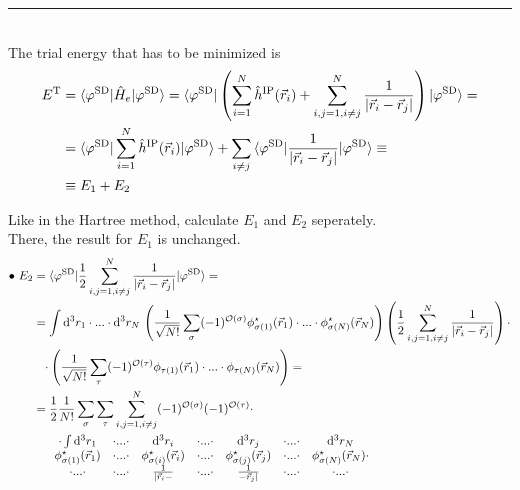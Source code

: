 \documentclass{article}
\newcommand{\diff}{\mathrm{d}}
\newcommand{\lr}[1]{\left(#1\right)}
\begin{document}
{\color{violet}
\hrule
	\\
	The trial energy that has to be minimized is
		\begin{align*}
			E^\text{T} &= \braket{ \varphi^\text{SD} | \hat{H}_e | \varphi^\text{SD} } = \braket{ \varphi^\text{SD} | \lr{ \sum_{i=1}^N \hat{h}^\text{IP}(\vec{r}_i) + \sum_{i,j=1,i\neq j}^N \frac{1}{|\vec{r}_i - \vec{r}_j|} } | \varphi^\text{SD} } = \\
			&= \braket{ \varphi^\text{SD} | \sum_{i=1}^N \hat{h}^\text{IP}(\vec{r}_i) | \varphi^\text{SD} } + \sum_{i\neq j} \braket{ \varphi^\text{SD} | \frac{1}{|\vec{r}_i - \vec{r}_j|} | \varphi^\text{SD} } \equiv\\
			&\equiv E_1 + E_2
		\end{align*}				

	Like in the Hartree method, calculate $E_1$ and $E_2$ seperately.\\
	There, the result for $E_1$ is unchanged.
		\begin{align*}
			\bullet \ E_2 &= \braket{ \varphi^\text{SD} | \frac{1}{2} \sum_{i,j=1,i\neq j}^N \frac{1}{|\vec{r}_i - \vec{r}_j|} | \varphi^\text{SD} } = \\
			&= \int \diff^3r_1 \cdot ... \cdot \diff^3r_N \, \lr{ \frac{1}{\sqrt{N!}} \sum_\sigma (-1)^{\mathcal{O}(\sigma)} \phi_{\sigma(1)}^\star(\vec{r}_1) \cdot ... \cdot \phi_{\sigma(N)}^\star(\vec{r}_N) } \lr{ \frac{1}{2} \sum_{i,j=1,i\neq j}^N \frac{1}{|\vec{r}_i - \vec{r}_j|} } \cdot \\
			&\phantom{=} \cdot \lr{ \frac{1}{\sqrt{N!}} \sum_\tau (-1)^{\mathcal{O}(\tau)} \phi_{\tau(1)}(\vec{r}_1) \cdot ... \cdot \phi_{\tau(N)}(\vec{r}_N) } = \\
			&= \frac{1}{2} \frac{1}{N!} \sum_\sigma \sum_\tau \sum_{i,j=1,i\neq j}^N (-1)^{\mathcal{O}(\sigma)} (-1)^{\mathcal{O}(\tau)} \cdot \\
			&\phantom{=}
			\begin{matrix}
			& \cdot  \int \diff^3r_1 & \cdot ... \cdot & \diff^3r_i & \cdot ... \cdot & \diff^3r_j & \cdot ... \cdot & \diff^3r_N \\
				& \phi_{\sigma(1)}^\star(\vec{r}_1) & \cdot ... \cdot & \phi_{\sigma(i)}^\star(\vec{r}_i) & \cdot ... \cdot & \phi_{\sigma(j)}^\star(\vec{r}_j) & \cdot ... \cdot & \phi_{\sigma(N)}^\star(\vec{r}_N) \cdot \\
		& \cdot ... \cdot & \cdot ... \cdot & \frac{1}{|\vec{r}_i-} & \cdot ... \cdot & \frac{1}{-\vec{r}_j|} & \cdot ... \cdot & \cdot ... \cdot \\

\end{matrix}
\end{align*}}
\end{document}
